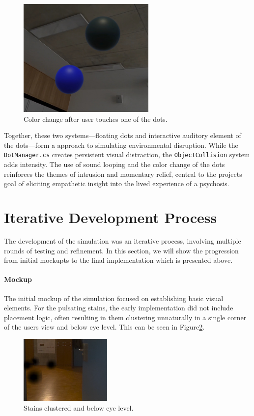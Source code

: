 \begin{figure}[H]
    \centering
    \includegraphics[width=0.6\textwidth]{../../Figures/dots-after-touch.jpg}
    \caption{Color change after user touches one of the dots.}
    \label{fig:dots_after}
\end{figure}


Together, these two systems—floating dots and interactive auditory element of the dots—form a approach to simulating environmental disruption. While the \texttt{DotManager.cs} creates persistent visual distraction, the \texttt{ObjectCollision} system adds intensity. The use of sound looping and the color change of the dots reinforces the themes of intrusion and momentary relief, central to the projects goal of eliciting empathetic insight into the lived experience of a psychosis.

\section{Iterative Development Process}
The development of the simulation was an iterative process, involving multiple rounds of testing and refinement. In this section, we will show the progression from initial mockupts to the final implementation which is presented above.

\paragraph{Mockup}
The initial mockup of the simulation focused on establishing basic visual elements. For the pulsating stains, the early implementation did not include  placement logic, often resulting in them clustering unnaturally in a single corner of the users view and below eye level. This can be seen in Figure\ref{fig:dots_clustered}.

\begin{figure}[H]
    \centering
    \includegraphics[width=0.4\textwidth]{../../Figures/dots-clustered.png}
    \caption{Stains clustered and below eye level.}
    \label{fig:dots_clustered}
\end{figure}


